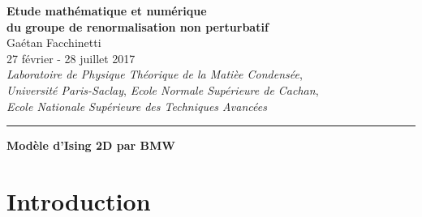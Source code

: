 \documentclass[10pt]{article}
\begin{document}
\vspace*{-22pt}
\begin{center}
\textbf{\Large Etude mathématique et numérique \\ du groupe de renormalisation non perturbatif}\\
\vspace*{4pt}
Gaétan Facchinetti \\
{\small 27 février - 28 juillet 2017\\
\vspace*{5pt}
\textit{Laboratoire de Physique Théorique de la Matièe Condensée},\\
\textit{Université Paris-Saclay}, \textit{Ecole Normale Supérieure de Cachan}, \\
\textit{Ecole Nationale Supérieure des Techniques Avancées}}\\
\end{center}


\begin{center}
\rule{10cm}{1pt}
\end{center}

\vspace*{11pt}

\begin{center}
{\LARGE \textbf{Modèle d'Ising 2D par BMW}}
\end{center}

\section{Introduction}
\end{document}
